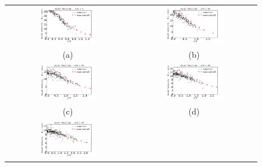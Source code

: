 \begin{figure}[!htb]
 \centering
\begin{tabular}{cc}
 \includegraphics[width=0.5\textwidth]{./figuras/chap5/Ux/Ux_drops/Ux_x5.png} & \includegraphics[width=0.5\textwidth]{./figuras/chap5/Ux/Ux_drops/Ux_x10.png} \\
(a) & (b) \\
\includegraphics[width=0.5\textwidth]{./figuras/chap5/Ux/Ux_drops/Ux_x15.png} & \includegraphics[width=0.5\textwidth]{./figuras/chap5/Ux/Ux_drops/Ux_x20.png} \\
(c) & (d) \\
\includegraphics[width=0.5\textwidth]{./figuras/chap5/Ux/Ux_drops/Ux_x25.png} &   \\

\end{tabular}
\end{figure}
